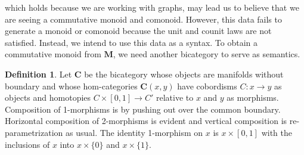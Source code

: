 \documentclass[11pt]{amsart}
\newcommand{\cat}[1]{\mathbf{#1}}
\newcommand{\from}{\colon}
\theoremstyle{remark}
\theoremstyle{definition}
\newtheorem{defn}[thm]{Definition}
\begin{document}
which holds because we are working with graphs,
may lead us to believe that
we are seeing a commutative 
monoid and comonoid.  
However, this data fails to 
generate a monoid or comonoid because 
the unit and counit laws are not satisfied.
Instead, we intend to use 
this data as a syntax.   
To obtain a commutative monoid
from $\cat{M}$,
we need another bicategory 
to serve as semantics. 

\begin{defn}
	Let $\cat{C}$ be the bicategory 
	whose objects are 
	manifolds without boundary and 
	whose hom-categories $\cat{C}(x,y)$ 
	have cobordisms $C \from x \to y$ as objects 
	and homotopies $C \times [0,1] \to C'$ 
	relative to $x$ and $y$ as morphisms. 
	Composition of 1-morphisms is by pushing
	out over the common boundary.  
	Horizontal composition of 2-morphisms 
	is evident and 
	vertical composition is 
	re-parametrization as usual. 
	The identity 1-morphism on 
	$x$ is $x \times [0,1]$ with the 
	inclusions of $x$ into 
	$x \times \{ 0 \}$ and $x \times \{ 1 \}$.  
\end{defn}  
\end{document}
